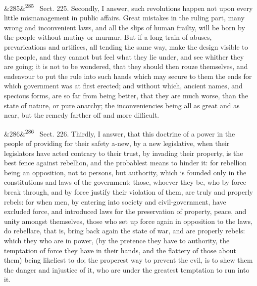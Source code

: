 \documentclass[12pt]{article}
\newcommand{\para}[1][]{\par\noindent\ifx&#1&\else\textsuperscript{\footnotesize #1}~\fi}
\begin{document}
\para[285] Sect. 225. Secondly, I answer, such revolutions happen not upon every little mismanagement in public affairs. Great mistakes in the ruling part, many wrong and inconvenient laws, and all the slips of human frailty, will be born by the people without mutiny or murmur. But if a long train of abuses, prevarications and artifices, all tending the same way, make the design visible to the people, and they cannot but feel what they lie under, and see whither they are going; it is not to be wondered, that they should then rouze themselves, and endeavour to put the rule into such hands which may secure to them the ends for which government was at first erected; and without which, ancient names, and specious forms, are so far from being better, that they are much worse, than the state of nature, or pure anarchy; the inconveniencies being all as great and as near, but the remedy farther off and more difficult.

\para[286] Sect. 226. Thirdly, I answer, that this doctrine of a power in the people of providing for their safety a-new, by a new legislative, when their legislators have acted contrary to their trust, by invading their property, is the best fence against rebellion, and the probablest means to hinder it: for rebellion being an opposition, not to persons, but authority, which is founded only in the constitutions and laws of the government; those, whoever they be, who by force break through, and by force justify their violation of them, are truly and properly rebels: for when men, by entering into society and civil-government, have excluded force, and introduced laws for the preservation of property, peace, and unity amongst themselves, those who set up force again in opposition to the laws, do rebellare, that is, bring back again the state of war, and are properly rebels: which they who are in power, (by the pretence they have to authority, the temptation of force they have in their hands, and the flattery of those about them) being likeliest to do; the properest way to prevent the evil, is to shew them the danger and injustice of it, who are under the greatest temptation to run into it.
\end{document}
